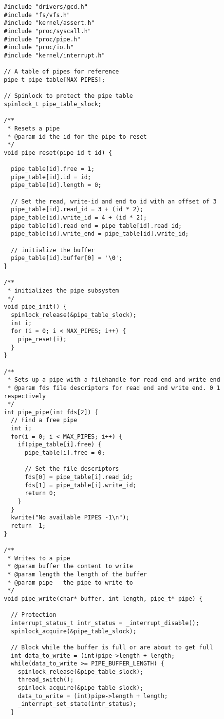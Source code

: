\documentclass[12pt]{article}
\begin{document}
\begin{lstlisting}[caption=pipe.c]
#include "drivers/gcd.h"
#include "fs/vfs.h"
#include "kernel/assert.h"
#include "proc/syscall.h"
#include "proc/pipe.h"
#include "proc/io.h"
#include "kernel/interrupt.h"

// A table of pipes for reference
pipe_t pipe_table[MAX_PIPES];

// Spinlock to protect the pipe table
spinlock_t pipe_table_slock;

/**
 * Resets a pipe
 * @param id the id for the pipe to reset
 */
void pipe_reset(pipe_id_t id) {

  pipe_table[id].free = 1;
  pipe_table[id].id = id;
  pipe_table[id].length = 0;

  // Set the read, write-id and end to id with an offset of 3
  pipe_table[id].read_id = 3 + (id * 2);
  pipe_table[id].write_id = 4 + (id * 2);
  pipe_table[id].read_end = pipe_table[id].read_id;
  pipe_table[id].write_end = pipe_table[id].write_id;

  // initialize the buffer
  pipe_table[id].buffer[0] = '\0';
}

/**
 * initializes the pipe subsystem
 */
void pipe_init() {
  spinlock_release(&pipe_table_slock);
  int i;
  for (i = 0; i < MAX_PIPES; i++) {
    pipe_reset(i);
  }
}

/**
 * Sets up a pipe with a filehandle for read end and write end
 * @param fds file descriptors for read end and write end. 0 1 respectively
 */
int pipe_pipe(int fds[2]) {
  // Find a free pipe
  int i;
  for(i = 0; i < MAX_PIPES; i++) {
    if(pipe_table[i].free) {
      pipe_table[i].free = 0;

      // Set the file descriptors
      fds[0] = pipe_table[i].read_id;
      fds[1] = pipe_table[i].write_id;
      return 0;
    }
  }
  kwrite("No available PIPES -1\n");
  return -1;
}

/**
 * Writes to a pipe
 * @param buffer the content to write
 * @param length the length of the buffer
 * @param pipe   the pipe to write to
 */
void pipe_write(char* buffer, int length, pipe_t* pipe) {

  // Protection
  interrupt_status_t intr_status = _interrupt_disable();
  spinlock_acquire(&pipe_table_slock);

  // Block while the buffer is full or are about to get full
  int data_to_write = (int)pipe->length + length;
  while(data_to_write >= PIPE_BUFFER_LENGTH) {
    spinlock_release(&pipe_table_slock);
    thread_switch();
    spinlock_acquire(&pipe_table_slock);
    data_to_write = (int)pipe->length + length;
    _interrupt_set_state(intr_status);
  }


\end{lstlisting}
\end{document}
